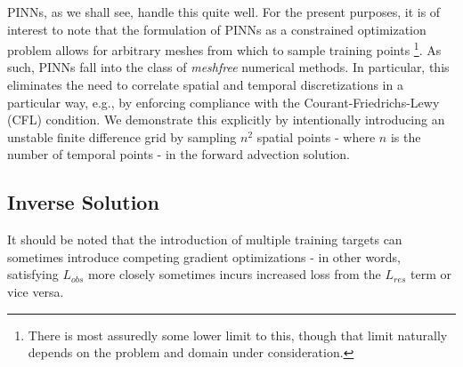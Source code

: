 \documentclass[letterpaper,12pt]{article}
\begin{document}
    PINNs, as we shall see, handle this quite well. For the present purposes, it is of interest to note that the 
    formulation of PINNs as a constrained optimization problem allows for arbitrary meshes from which to sample training
    points \footnote{
        There is most assuredly some lower limit to this, though that limit naturally depends on the problem and domain 
        under consideration.
    }. As such, PINNs fall into the class of \textit{meshfree} numerical methods. In particular, this eliminates
    the need to correlate spatial and temporal discretizations in a particular way, e.g., by enforcing compliance with
    the Courant-Friedrichs-Lewy (CFL) condition. We demonstrate this explicitly by intentionally introducing an unstable
    finite difference grid by sampling $n^2$ spatial points - where $n$ is the number of temporal points - in the 
    forward advection solution.

    \subsection*{Inverse Solution}
    It should be noted that the introduction of multiple training targets can sometimes introduce competing gradient 
    optimizations - in other words, satisfying $L_{obs}$ more closely sometimes incurs increased loss from the $L_{res}$
    term or vice versa.

    \pagebreak
    \nocite{*}
    
    
\end{document}
